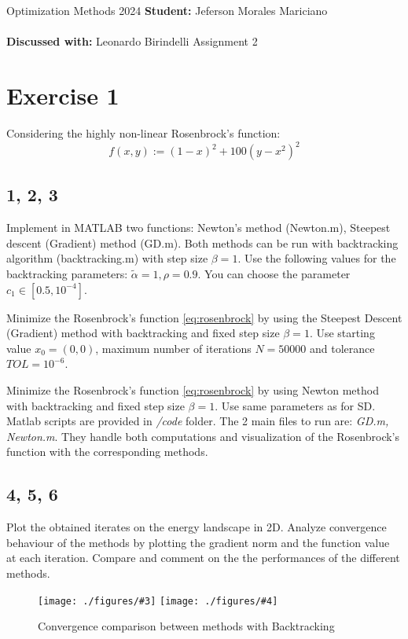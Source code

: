 \documentclass[unicode,11pt,a4paper,oneside,numbers=endperiod,openany]{scrartcl}
\newcommand{\myFigureComparison}[4]{
    \begin{figure}[H]
    \centering
    \caption{#1}
    \label{#2}
    \texttt{[image: ./figures/\#3]}
    \texttt{[image: ./figures/\#4]}
    \end{figure}
}
\begin{document}
\setassignment
{}

\serieheader
{Optimization Methods}
{2024}
{\textbf{Student:} Jeferson Morales Mariciano \\\\}
{\textbf{Discussed with:} Leonardo Birindelli}
{Assignment 2}{}
\newline



\section*{Exercise 1}
Considering the highly non-linear Rosenbrock's function:
\begin{equation} \label{eq:rosenbrock}
    f(x, y) := (1 - x)^2 + 100(y - x^2)^2 
\end{equation}

\subsection*{1, 2, 3}
Implement in MATLAB two functions: 
Newton's method (Newton.m), Steepest descent (Gradient) method (GD.m).
Both methods can be run with backtracking algorithm (backtracking.m) with step size $\beta = 1$. 
Use the following values for the backtracking parameters: 
$\tilde{\alpha} = 1, \rho = 0.9$. 
You can choose the parameter $c_1 \in [0.5, 10^{-4}]$.

Minimize the Rosenbrock's function \ref{eq:rosenbrock} 
by using the Steepest Descent (Gradient) method with backtracking and fixed step size $\beta = 1$. 
Use starting value $x_0 = (0, 0)$, 
maximum number of iterations $N = 50000$ and tolerance $TOL = 10^{-6}$.

Minimize the Rosenbrock's function \ref{eq:rosenbrock} 
by using Newton method with backtracking and fixed step size $\beta = 1$. 
Use same parameters as for SD.
\\\newline
Matlab scripts are provided in \textit{/code} folder.
The 2 main files to run are: \textit{GD.m, Newton.m}.
They handle both computations and visualization of the Rosenbrock's function with the corresponding methods.

\subsection*{4, 5, 6}
Plot the obtained iterates on the energy landscape in 2D.
Analyze convergence behaviour of the methods by plotting the gradient norm and the function
value at each iteration.
Compare and comment on the the performances of the different methods.
\\\newline
\myFigureComparison
    {Convergence comparison between methods with Backtracking}
    {fig:ex1-convergence-comparison-backtracking}
    {ex1-sd-backtracking-convergence.eps}
    {ex1-newton-backtracking-convergence.eps}
\end{document}
